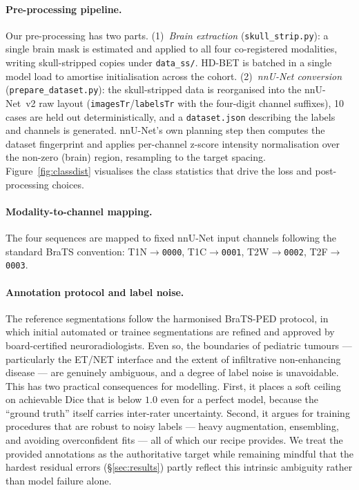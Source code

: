 \documentclass[11pt,a4paper]{article}
\begin{document}
\paragraph{Pre-processing pipeline.}
Our pre-processing has two parts. (1)~\emph{Brain extraction}
(\texttt{skull\_strip.py}): a single brain mask is estimated and applied to all four
co-registered modalities, writing skull-stripped copies under \texttt{data\_ss/}.
HD-BET is batched in a single model load to amortise initialisation across the cohort.
(2)~\emph{nnU-Net conversion} (\texttt{prepare\_dataset.py}): the skull-stripped data
is reorganised into the nnU-Net~v2 raw layout (\texttt{imagesTr}/\texttt{labelsTr}
with the four-digit channel suffixes), 10 cases are held out deterministically, and a
\texttt{dataset.json} describing the labels and channels is generated. nnU-Net's own
planning step then computes the dataset fingerprint and applies per-channel z-score
intensity normalisation over the non-zero (brain) region, resampling to the target
spacing. Figure~\ref{fig:classdist} visualises the class statistics that drive the
loss and post-processing choices.

\paragraph{Modality-to-channel mapping.}
The four sequences are mapped to fixed nnU-Net input channels following the standard
BraTS convention: T1N$\to$\texttt{0000}, T1C$\to$\texttt{0001}, T2W$\to$\texttt{0002},
T2F$\to$\texttt{0003}.

\paragraph{Annotation protocol and label noise.}
The reference segmentations follow the harmonised BraTS-PED protocol, in which initial
automated or trainee segmentations are refined and approved by board-certified
neuroradiologists. Even so, the boundaries of pediatric tumours --- particularly the
ET/NET interface and the extent of infiltrative non-enhancing disease --- are
genuinely ambiguous, and a degree of label noise is unavoidable. This has two
practical consequences for modelling. First, it places a soft ceiling on achievable
Dice that is below $1.0$ even for a perfect model, because the ``ground truth'' itself
carries inter-rater uncertainty. Second, it argues for training procedures that are
robust to noisy labels --- heavy augmentation, ensembling, and avoiding overconfident
fits --- all of which our recipe provides. We treat the provided annotations as the
authoritative target while remaining mindful that the hardest residual errors
(\S\ref{sec:results}) partly reflect this intrinsic ambiguity rather than model
failure alone.
\end{document}
